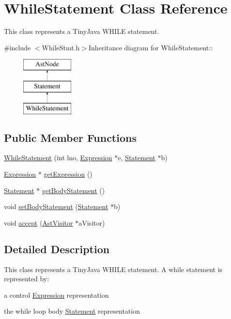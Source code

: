 \hypertarget{classWhileStatement}{
\section{WhileStatement Class Reference}
\label{classWhileStatement}
}


This class represents a TinyJava WHILE statement.  


{\ttfamily \#include $<$WhileStmt.h$>$}Inheritance diagram for WhileStatement::\begin{figure}[H]
\begin{center}
\leavevmode
\includegraphics[height=3cm]{classWhileStatement}
\end{center}
\end{figure}
\subsection*{Public Member Functions}
\begin{DoxyCompactItemize}
\item 
\hyperlink{classWhileStatement_ab75b71383a4c7f1c8ad103cab6f02b10}{WhileStatement} (int lno, \hyperlink{classExpression}{Expression} $\ast$e, \hyperlink{classStatement}{Statement} $\ast$b)
\item 
\hyperlink{classExpression}{Expression} $\ast$ \hyperlink{classWhileStatement_a8ccd99538f16bc15feb7f7eff947a923}{getExpression} ()
\item 
\hyperlink{classStatement}{Statement} $\ast$ \hyperlink{classWhileStatement_a68631c014236d2a635aa4395c6dd229c}{getBodyStatement} ()
\item 
void \hyperlink{classWhileStatement_abde6377670b22bad622f1a2ec2aade65}{setBodyStatement} (\hyperlink{classStatement}{Statement} $\ast$b)
\item 
void \hyperlink{classWhileStatement_aeb7e6e61053a3e8a7b82a54c4eb8bf0d}{accept} (\hyperlink{classAstVisitor}{AstVisitor} $\ast$aVisitor)
\end{DoxyCompactItemize}


\subsection{Detailed Description}
This class represents a TinyJava WHILE statement. A while statement is represented by:
\begin{DoxyItemize}
\item a control \hyperlink{classExpression}{Expression} representation
\item the while loop body \hyperlink{classStatement}{Statement} representation 
\end{DoxyItemize}

